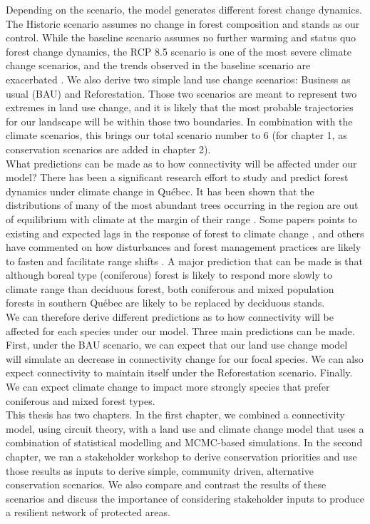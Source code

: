 \documentclass[12pt,Bold,TexShade]{thesis/mcgilletdclass}
\begin{document}
{Depending on the scenario, the model generates different forest change dynamics. The Historic scenario assumes no change in forest composition and stands as our control. While the baseline scenario assumes no further warming and status quo forest change dynamics, the RCP 8.5 scenario is one of the most severe climate change scenarios, and the trends observed in the baseline scenario are exacerbated \cite{ipcc_summary_2013}. We also derive two simple land use change scenarios: Business as usual (BAU) and Reforestation. Those two scenarios are meant to represent two extremes in land use change, and it is likely that the most probable trajectories for our landscape will be within those two boundaries. In combination with the climate scenarios, this brings our total scenario number to 6 (for chapter 1, as conservation scenarios are added in chapter 2). \\

What predictions can be made as to how connectivity will be affected under our model? There has been a significant research effort to study and predict forest dynamics under climate change in Québec. It has been shown that the distributions of many of the most abundant trees occurring in the region are out of equilibrium with climate at the margin of their range \citep{talluto_extinction_2017}. Some papers points to existing and expected lags in the response of forest to climate change \citep{savage_elevational_2015}, and others have commented on how disturbances and forest management practices are likely to fasten and facilitate range shifts \citep{leithead_northward_2010, boulanger_climate_2019, vieira_paying_2020}. A major prediction that can be made is that although boreal type (coniferous) forest is likely to respond more slowly to climate range than deciduous forest, both coniferous and mixed population forests in southern Québec are likely to be replaced by deciduous stands. \\

We can therefore derive different predictions as to how connectivity will be affected for each species under our model. Three main predictions can be made. First, under the BAU scenario, we can expect that our land use change model will simulate an decrease in connectivity change for our focal species. We can also expect connectivity to maintain itself under the Reforestation scenario. Finally. We can expect climate change to impact more strongly species that prefer coniferous  and mixed forest types. \\

This thesis has two chapters.  In the first chapter, we combined a connectivity model, using circuit theory, with a land use and climate change model that uses a combination of statistical modelling and MCMC-based simulations. In the second chapter, we ran a stakeholder workshop to derive conservation priorities and use those results as inputs to derive simple, community driven, alternative conservation scenarios. We also compare and contrast the results of these scenarios and discuss the importance of considering stakeholder inputs to produce a resilient network of protected areas. \\
}%
\Intro
\end{document}
